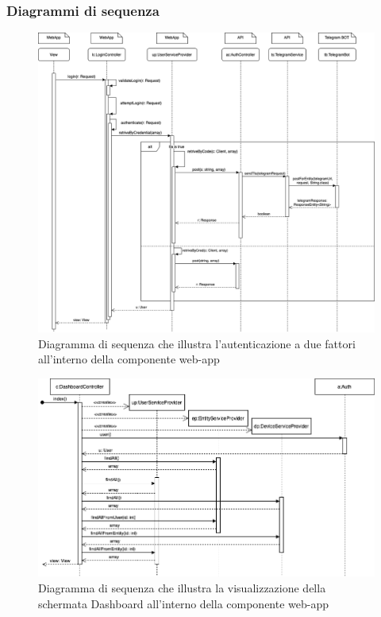 \begin{landscape}
	\subsubsection{Diagrammi di sequenza}%
		\begin{figure}[H]
			\centering
			\includegraphics[scale=0.500]{res/images/WEBAPP/AutenticazioneTfa.png}
			\caption{Diagramma di sequenza che illustra l'autenticazione a due fattori all'interno della componente web-app}
			\label{Diagramma 23}
		\end{figure}
		\begin{figure}[H]
			\centering
			\includegraphics[scale=0.600]{res/images/WEBAPP/Dashboard.index.png}
			\caption{Diagramma di sequenza che illustra la visualizzazione della schermata Dashboard all'interno della componente web-app}
			\label{Diagramma 24}
		\end{figure}
	\end{landscape}